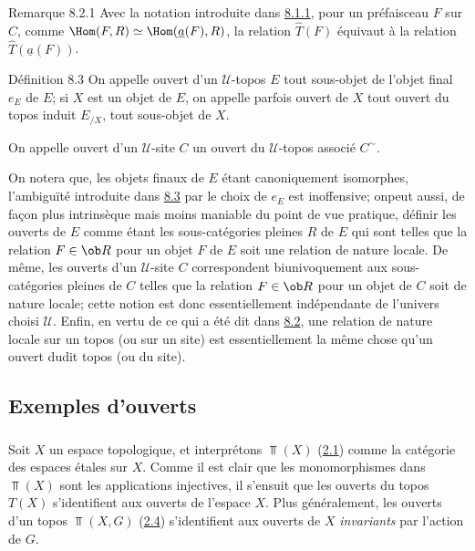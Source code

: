 \documentclass[10pt]{../fichiers-configuration-latex/smfart}
\begin{document}
\begin{enonce*}[remark]{Remarque 8.2.1}
Avec la notation introduite dans \hyperref[IV.rem8.1.1]{8.1.1}, pour un
préfaisceau $F$ sur $C$, comme $\Hom(F,R)\simeq
\Hom(\underline{a}(F),R)$, la relation $\widehat{T}(F)$ équivaut à la
relation $\widehat{T}(\underline{a}(F))$.
\end{enonce*}

\begin{enonce*}{Définition 8.3}
On appelle ouvert d'un $𝒰$-topos $E$ tout sous-objet de
l'objet final $e_E$ de $E$; si $X$ est un objet de $E$, on appelle
parfois ouvert de $X$ tout ouvert du topos induit $E_{/X}$, \ie tout
sous-objet de $X$.

On appelle ouvert d'un $𝒰$-site $C$ un ouvert du
$𝒰$-topos associé $C^{\sim}$.
\end{enonce*}

On notera que, les objets finaux de $E$ étant canoniquement
isomorphes, l'ambiguïté introduite dans \hyperref[IV.def8.3]{8.3} par le choix
de $e_E$ est inoffensive; on\pageoriginale peut aussi, de façon plus
intrinsèque mais moins maniable du point de vue pratique, définir
les ouverts de $E$ comme étant les sous-catégories pleines $R$ de
$E$ qui sont telles que la relation $F\in \ob R$ pour un objet $F$
de $E$ soit une relation de nature locale. De même, les ouverts d'un
$𝒰$-site $C$ correspondent biunivoquement aux
sous-catégories pleines de $C$ telles que la relation $F\in \ob R$
pour un objet de $C$ soit de nature locale; cette notion est donc
essentiellement indépendante de l'univers choisi $𝒰$. Enfin,
en vertu de ce qui a été dit dans \hyperref[IV.subsec8.2]{8.2}, une relation
de nature locale sur un topos (ou sur un site) est essentiellement
la même chose qu'un ouvert dudit topos (ou du site).

\setcounter{subsection}{3}
\subsection{Exemples d'ouverts}

\subsubsection{}
Soit $X$ un espace topologique, et interprétons $\Top(X)$
(\hyperref[IV.subsec2.1]{2.1}) comme la catégorie des espaces étales sur $X$.
Comme il est clair que les monomorphismes dans $\Top(X)$ sont les
applications injectives, il s'ensuit que les ouverts du topos $T(X)$
s'identifient aux ouverts de l'espace $X$. Plus généralement, les
ouverts d'un topos $\Top(X,G)$ (\hyperref[IV.subsec2.4]{2.4}) s'identifient
aux ouverts de $X$ \emph{invariants} par l'action de $G$.
\end{document}
